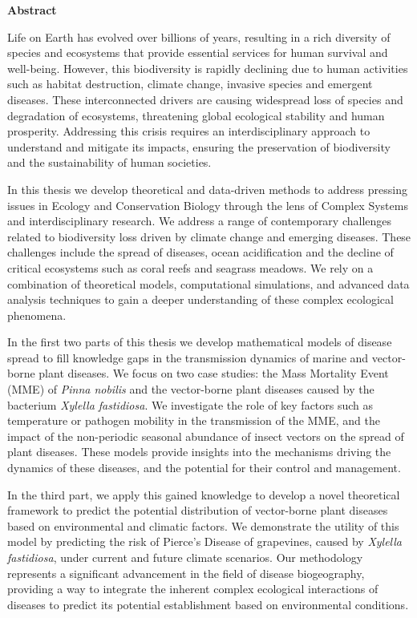 \pagebreak
\thispagestyle{empty}

\begin{center}
    \textbf{\Large Abstract}
\end{center}

Life on Earth has evolved over billions of years, resulting in a rich
diversity of species and ecosystems that provide essential services for
human survival and well-being. However, this biodiversity is rapidly
declining due to human activities such as habitat destruction, climate
change, invasive species and emergent diseases. These interconnected
drivers are causing widespread loss of species and degradation of
ecosystems, threatening global ecological stability and human prosperity.
Addressing this crisis requires an interdisciplinary approach to understand
and mitigate its impacts, ensuring the preservation of biodiversity and the
sustainability of human societies.

In this thesis we develop theoretical and data-driven methods
to address pressing issues in Ecology and Conservation Biology through the
lens of Complex Systems and interdisciplinary research. We address a
range of contemporary challenges related to biodiversity loss driven by
climate change and emerging diseases. These challenges include the spread
of diseases, ocean acidification and the decline of critical ecosystems such as
coral reefs and seagrass meadows. We rely on a combination of theoretical
models, computational simulations, and advanced data analysis techniques to
gain a deeper understanding of these complex ecological phenomena.

In the first two parts of this thesis we develop mathematical models of
disease spread to fill knowledge gaps in the transmission dynamics of
marine and vector-borne plant diseases. We focus on two case studies: the
Mass Mortality Event (MME) of \textit{Pinna nobilis} and the vector-borne plant
diseases caused by the bacterium \textit{Xylella fastidiosa}. We investigate
the role of key factors such as temperature or pathogen mobility in the
transmission of the MME, and the impact of the non-periodic seasonal abundance
of insect vectors on the spread of plant diseases. These models provide
insights into the mechanisms driving the dynamics of these diseases, and the
potential for their control and management.

In the third part, we apply this gained knowledge to develop a novel
theoretical framework to predict the potential distribution of
vector-borne plant diseases based on environmental and climatic factors. We
demonstrate the utility of this model by predicting the risk of Pierce's
Disease of grapevines, caused by \textit{Xylella fastidiosa}, under current
and future climate scenarios. Our methodology represents a significant
advancement in the field of disease biogeography, providing a way to
integrate the inherent complex ecological interactions of diseases to predict
its potential establishment based on environmental conditions.

